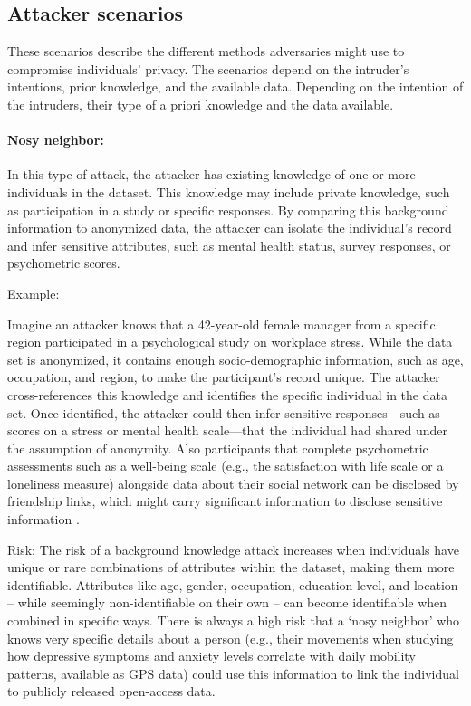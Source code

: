\documentclass{article}
\begin{document}
\subsection{Attacker scenarios}

These scenarios describe the different methods adversaries might use to compromise individuals' privacy. The scenarios depend on the intruder's intentions, prior knowledge, and the available data.
Depending on the intention of the intruders, their type of a priori knowledge and the data available.

\paragraph{Nosy neighbor:}
\color{blue} %

In this type of attack, the attacker has existing knowledge of one or more individuals in the dataset. This knowledge may include  private knowledge, such as participation in a study or specific responses. By comparing this background information to anonymized data, the attacker can isolate the individual's record and infer sensitive attributes, such as mental health status, survey responses, or psychometric scores.

Example:

Imagine an attacker knows that a 42-year-old female manager from a specific region participated in a psychological study on workplace stress. While the data set is anonymized, it contains enough socio-demographic information, such as age, occupation, and region, to make the participant’s record unique. The attacker cross-references this knowledge and identifies the specific individual in the data set. Once identified, the attacker could then infer sensitive responses—such as scores on a stress or mental health scale—that the individual had shared under the assumption of anonymity.
Also participants that complete psychometric assessments such as a well-being scale (e.g., the satisfaction with life scale or a loneliness measure) alongside data about their social network can be disclosed by friendship links, which might carry significant information to disclose sensitive information \citep{Zheleva09}.

Risk: The risk of a background knowledge attack increases when individuals have unique or rare combinations of attributes within the dataset, making them more identifiable. Attributes like age, gender, occupation, education level, and location -- while seemingly non-identifiable on their own -- can become identifiable when combined in specific ways. There is always a high risk that a ‘nosy neighbor’ who knows very specific details about a person (e.g., their movements when studying how depressive symptoms and anxiety levels correlate with daily mobility patterns, available as GPS data) could use this information to link the individual to publicly released open-access data.
\end{document}
